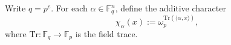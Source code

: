 \begin{definition}
\label{def:additive-characters}
\leanok
Write $q = p^e$. For each $\alpha \in \mathbb{F}_q^n$,
  define the additive character
  \[
    \chi_\alpha(x) := \omega_p^{\mathrm{Tr}(\langle \alpha, x\rangle)},
  \]
  where $\mathrm{Tr} : \mathbb{F}_q \to \mathbb{F}_p$ is the field trace.
\end{definition}
